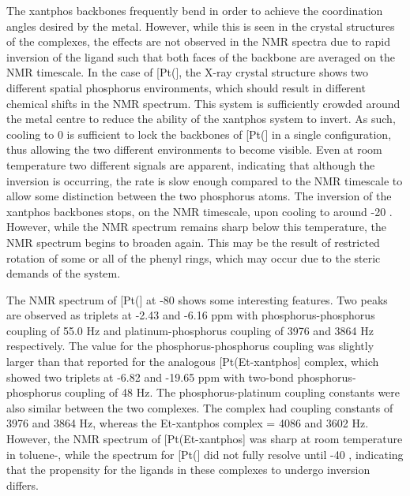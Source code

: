 The xantphos backbones frequently bend in order to achieve the coordination angles desired by the metal.  However, while this is seen in the crystal structures of the complexes, the effects are not observed in the NMR spectra due to rapid inversion of the ligand such that both faces of the backbone are averaged on the NMR timescale.  In the case of [Pt(\Phthixantphos{}], the X-ray crystal structure shows two different spatial phosphorus environments, which should result in different chemical shifts in the \phosphorus{} NMR spectrum.  This system is sufficiently crowded around the metal centre to reduce the ability of the xantphos system to invert.  As such, cooling to 0 \degC{} is sufficient to lock the backbones of [Pt(\Phthixantphos{}] in a single configuration, thus allowing the two different \phosphorus{} environments to become visible.  Even at room temperature two different signals are apparent, indicating that although the inversion is occurring, the rate is slow enough compared to the NMR timescale to allow some distinction between the two phosphorus atoms.  The inversion of the xantphos backbones stops, on the NMR timescale, upon cooling to around -20 \degC.  However, while the \phosphorus{} NMR spectrum remains sharp below this temperature, the \proton{} NMR spectrum begins to broaden again.  This may be the result of restricted rotation of some or all of the phenyl rings, which may occur due to the steric demands of the system.  

The \phosphorus{} NMR spectrum of [Pt(\Phthixantphos{}] at -80 \degC{} shows some interesting features.  Two peaks are observed as triplets at -2.43 and -6.16 ppm with phosphorus-phosphorus coupling of 55.0 Hz and platinum-phosphorus coupling of 3976 and 3864 Hz respectively.  The value for the phosphorus-phosphorus coupling was slightly larger than that reported for the analogous [Pt(Et-xantphos] complex, which showed two triplets at -6.82 and -19.65 ppm with two-bond phosphorus-phosphorus coupling of 48 Hz.\cite{Miedaner2004}  The phosphorus-platinum coupling constants were also similar between the two complexes.  The \Phthixantphos{} complex had coupling constants of 3976 and 3864 Hz, whereas the Et-xantphos complex \JPtP{}  = 4086 and 3602 Hz.  However, the \phosphorus{} NMR spectrum of [Pt(Et-xantphos] was sharp at room temperature in toluene-, while the spectrum for [Pt(\Phthixantphos{}] did not fully resolve until -40 \degC{}, indicating that the propensity for the ligands in these complexes to undergo inversion differs.\cite{Miedaner2004}

